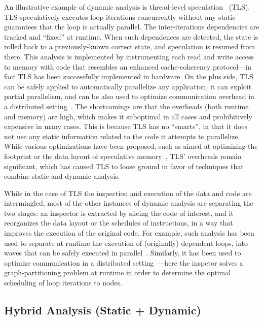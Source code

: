 An illustrative example of dynamic analysis is thread-level speculation~\cite{R-LRPD,LRPD} (TLS). TLS speculatively executes loop iterations concurrently without any static guarantees that the loop is actually parallel. The inter-iterations dependencies are tracked and ``fixed'' at runtime. When such dependences are detected, the state is rolled back to a previously-known correct state, and speculation is resumed from there.   This analysis is implemented by instrumenting each read and write access to memory with code that resembles an enhanced cache-coherency protocol---in fact TLS has been successfully implemented in hardware.   On the plus side, TLS can be safely applied to automatically parallelize any application, it can exploit partial parallelism, and can be also used to optimize communication overhead in a distributed setting~\cite{jaycos:DTLS}. The shortcomings are that the overheads (both runtime and memory) are high, which makes it suboptimal in all cases and prohibitively expensive in many cases. This is because TLS has no ``smarts'', in that it does not use any static information related to the code it attempts to parallelize.   While various optimizations have been proposed, such as aimed at optimizing the footprint or the data layout of speculative memory~\cite{Oancea:2008:SDA:1485701.1485712}, TLS' overheads remain significant, which has caused TLS to loose ground in favor of techniques that combine static and dynamic analysis.  

While in the case of TLS the inspection and execution of the data and code are intermingled, most of the other instances of dynamic analysis are separating the two stages: an inspector is extracted by slicing the code of interest, and it reorganizes the data layout or the schedules of instructions, in a way that improves the execution of the original code.   For example, such analysis has been used to separate at runtime the execution of (originally) dependent loops, into waves that can be safely executed in parallel~\cite{InspExecWave}. Similarly, it has been used to optimize communication in a distributed setting~\cite{Saday:InspExec}---here the inspctor solves a graph-partitioning problem at runtime in order to determine the optimal scheduling of loop iterations to nodes.

\subsection{Hybrid Analysis (Static + Dynamic)}
\label{relwork-hyb}

